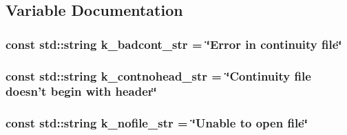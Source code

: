 \subsection{Variable Documentation}
\hypertarget{a00213_a760a72ad3121548c6c91caec9f3c3b33}{
\subsubsection[{k\-\_\-badcont\-\_\-str}]{\setlength{\rightskip}{0pt plus 5cm}const std\-::string k\-\_\-badcont\-\_\-str = \char`\"{}Error in continuity file\char`\"{}\hspace{0.3cm}{\ttfamily [static]}}}\label{a00213_a760a72ad3121548c6c91caec9f3c3b33}
\hypertarget{a00213_a9458c3e81a038858995316d45bac1ee6}{
\subsubsection[{k\-\_\-contnohead\-\_\-str}]{\setlength{\rightskip}{0pt plus 5cm}const std\-::string k\-\_\-contnohead\-\_\-str = \char`\"{}Continuity file doesn't begin with header\char`\"{}\hspace{0.3cm}{\ttfamily [static]}}}\label{a00213_a9458c3e81a038858995316d45bac1ee6}
\hypertarget{a00213_a0bb48eb642ae5c070a2678fdf5aea5b8}{
\subsubsection[{k\-\_\-nofile\-\_\-str}]{\setlength{\rightskip}{0pt plus 5cm}const std\-::string k\-\_\-nofile\-\_\-str = \char`\"{}Unable to open file\char`\"{}\hspace{0.3cm}{\ttfamily [static]}}}\label{a00213_a0bb48eb642ae5c070a2678fdf5aea5b8}
